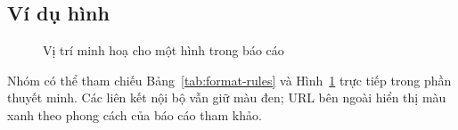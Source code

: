 \subsection{Ví dụ hình}

\begin{figure}[htbp]
  \centering
  \caption{Vị trí minh hoạ cho một hình trong báo cáo}
  \label{fig:placeholder}
\end{figure}

Nhóm có thể tham chiếu Bảng~\ref{tab:format-rules} và Hình~\ref{fig:placeholder} trực tiếp trong phần thuyết minh. Các liên kết nội bộ vẫn giữ màu đen; URL bên ngoài hiển thị màu xanh theo phong cách của báo cáo tham khảo.

